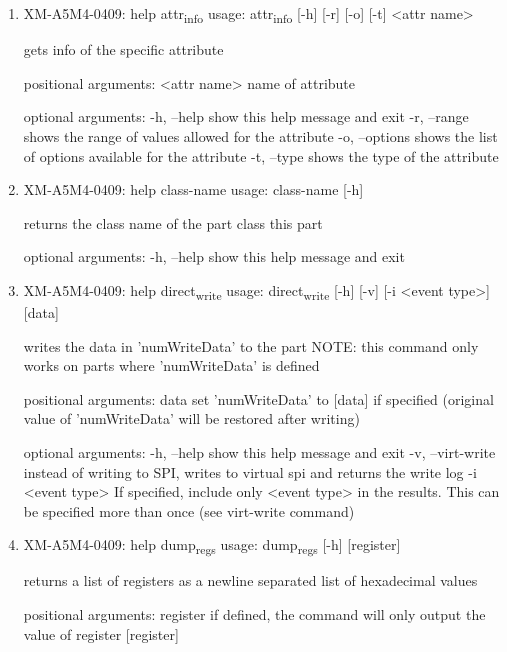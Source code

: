 \documentclass[11pt]{article}
\begin{document}
\begin{enumerate}
\item XM-A5M4-0409: help attr\textsubscript{info}
\label{sec:org9789064}
usage: attr\textsubscript{info} [-h] [-r] [-o] [-t] <attr name>

gets info of the specific attribute

positional arguments:
  <attr name>    name of attribute

optional arguments:
  -h, --help     show this help message and exit
  -r, --range    shows the range of values allowed for the attribute
  -o, --options  shows the list of options available for the attribute
  -t, --type     shows the type of the attribute

\item XM-A5M4-0409: help class-name
\label{sec:orgea38e49}
usage: class-name [-h]

returns the class name of the part class this part

optional arguments:
  -h, --help  show this help message and exit

\item XM-A5M4-0409: help direct\textsubscript{write}
\label{sec:orgbd901c2}
usage: direct\textsubscript{write} [-h] [-v] [-i <event type>] [data]

writes the data in 'numWriteData' to the part NOTE: this command only works on
parts where 'numWriteData' is defined

positional arguments:
  data              set 'numWriteData' to [data] if specified (original value
                    of 'numWriteData' will be restored after writing)

optional arguments:
  -h, --help        show this help message and exit
  -v, --virt-write  instead of writing to SPI, writes to virtual spi and
                    returns the write log
  -i <event type>   If specified, include only <event type> in the results.
                    This can be specified more than once (see virt-write
                    command)

\item XM-A5M4-0409: help dump\textsubscript{regs}
\label{sec:org745f222}
usage: dump\textsubscript{regs} [-h] [register]

returns a list of registers as a newline separated list of hexadecimal values

positional arguments:
  register    if defined, the command will only output the value of register
              [register]


\end{enumerate}
\end{document}
